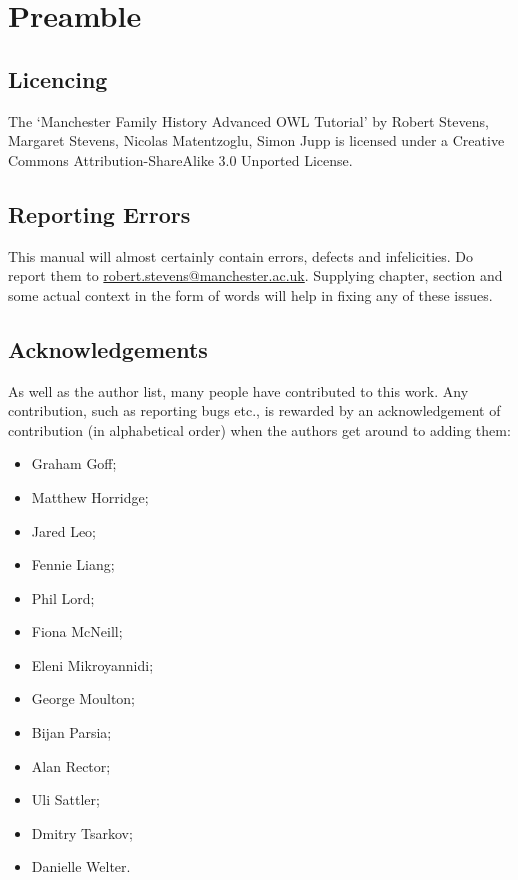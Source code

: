 \chapter*{Preamble}

\section{Licencing}

The `Manchester Family History Advanced OWL Tutorial' by Robert Stevens, Margaret Stevens, Nicolas Matentzoglu, Simon Jupp is licensed under a Creative Commons
Attribution-ShareAlike 3.0 Unported License.


\section{Reporting  Errors}

This manual will almost certainly contain errors, defects and infelicities. Do report them to \url{robert.stevens@manchester.ac.uk}. Supplying chapter, section and some actual context in the form of words will help in fixing any of these issues.

\section{Acknowledgements}

As well as the author list, many people have contributed to this work. Any contribution, such as reporting bugs etc., is rewarded by an acknowledgement of contribution (in alphabetical order) when the authors get around to adding them:

\begin{itemize}
\item Graham Goff;
\item Matthew Horridge;
\item Jared Leo;
\item Fennie Liang;
\item Phil Lord;
\item Fiona McNeill;
\item Eleni Mikroyannidi; 
\item George Moulton;
\item Bijan Parsia;
\item Alan Rector;
\item Uli Sattler;
\item Dmitry Tsarkov;
\item Danielle Welter.
\end{itemize}